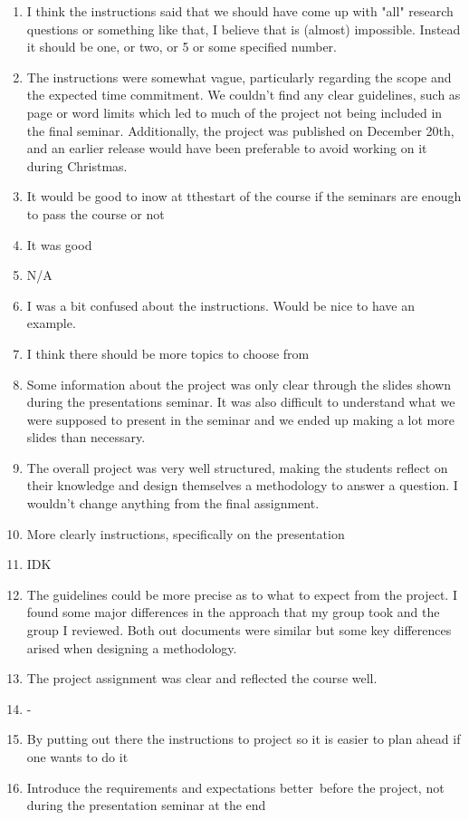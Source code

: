 \documentclass[a4paper]{report}
\begin{document}
\begin{enumerate}
  \item I think the instructions said that we should have come up with "all" research questions or something like that, I believe that is (almost) impossible. Instead it should be one, or two, or 5 or some specified number.
  \item The instructions were somewhat vague, particularly regarding the scope and the expected time commitment. We couldn't find any clear guidelines, such as page or word limits which led to much of the project not being included in the final seminar. Additionally, the project was published on December 20th, and an earlier release would have been preferable to avoid working on it during Christmas.
  \item It would be good to inow at tthestart of the course if the seminars are enough to pass the course or not
  \item It was good
  \item N/A
  \item I was a bit confused about the instructions. Would be nice to have an example.
  \item I think there should be more topics to choose from
  \item Some information about the project was only clear through the slides shown during the presentations seminar. It was also difficult to understand what we were supposed to present in the seminar and we ended up making a lot more slides than necessary.
  \item The overall project was very well structured, making the students reflect on their knowledge and design themselves a methodology to answer a question. I wouldn't change anything from the final assignment.
  \item More clearly instructions, specifically on the presentation 
  \item IDK
  \item The guidelines could be more precise as to what to expect from the project. I found some major differences in the approach that my group took and the group I reviewed. Both out documents were similar but some key differences arised when designing a methodology.
  \item The project assignment was clear and reflected the course well.
  \item -
  \item By putting out there the instructions to project so it is easier to plan ahead if one wants to do it 
  \item Introduce the requirements and expectations better before the project, not during the presentation seminar at the end

\end{enumerate}
\end{document}

